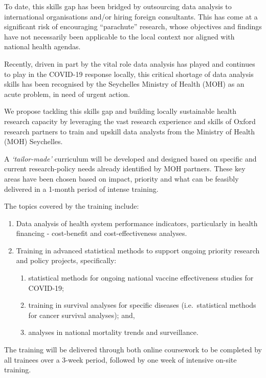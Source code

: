\documentclass[
  12pt,
]{book}
\begin{document}
To date, this skills gap has been bridged by outsourcing data analysis to international organisations and/or hiring foreign consultants. This has come at a significant risk of encouraging ``parachute'' research, whose objectives and findings have not necessarily been applicable to the local context nor aligned with national health agendas.

Recently, driven in part by the vital role data analysis has played and continues to play in the COVID-19 response locally, this critical shortage of data analysis skills has been recognised by the Seychelles Ministry of Health (MOH) as an acute problem, in need of urgent action.

We propose tackling this skills gap and building locally sustainable health research capacity by leveraging the vast research experience and skills of Oxford research partners to train and upskill data analysts from the Ministry of Health (MOH) Seychelles.

A \emph{`tailor-made'} curriculum will be developed and designed based on specific and current research-policy needs already identified by MOH partners. These key areas have been chosen based on impact, priority and what can be feasibly delivered in a 1-month period of intense training.

The topics covered by the training include:

\begin{enumerate}
\def\labelenumi{\arabic{enumi})}
\item
  Data analysis of health system performance indicators, particularly in health financing - cost-benefit and cost-effectiveness analyses.
\item
  Training in advanced statistical methods to support ongoing priority research and policy projects, specifically:

  \begin{enumerate}
  \def\labelenumii{(\roman{enumii})}
  \item
    statistical methods for ongoing national vaccine effectiveness studies for COVID-19;
  \item
    training in survival analyses for specific diseases (i.e.~statistical methods for cancer survival analyses); and,
  \item
    analyses in national mortality trends and surveillance.
  \end{enumerate}
\end{enumerate}

The training will be delivered through both online coursework to be completed by all trainees over a 3-week period, followed by one week of intensive on-site training.
\end{document}

